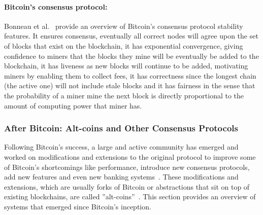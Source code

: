 \documentclass[letterpaper,twocolumn,10pt]{article}
\begin{document}
\paragraph{Bitcoin's consensus protocol:} Bonneau et al.~\cite{Bonneau:2015ema} provide an overview of Bitcoin's consensus protocol stability features. It ensures consensus, eventually all correct nodes will agree upon the set of blocks that exist on the blockchain, it has exponential convergence, giving confidence to miners that the blocks they mine will be eventually be added to the blockchain, it has liveness as new blocks will continue to be added, motivating miners by enabling them to collect fees, it has correctness since the longest chain (the active one) will not include stale blocks and it has fairness in the sense that the probability of a miner mine the next block is directly proportional to the amount of computing power that miner has.


\subsubsection{After Bitcoin: Alt-coins and Other Consensus Protocols}
\label{rel:alt-coins}

Following Bitcoin's success, a large and active community has emerged and worked on modifications and extensions to the original protocol to improve some of Bitcoin's shortcomings like performance, introduce new consensus protocols, add new features and even new banking systems~\cite{Danezis:2015ha}. These modifications and extensions, which are usually forks of Bitcoin or abstractions that sit on top of existing blockchains, are called ''alt-coins''~\cite{Bonneau:2015ema}. This section provides an overview of systems that emerged since Bitcoin's inception.
\end{document}
